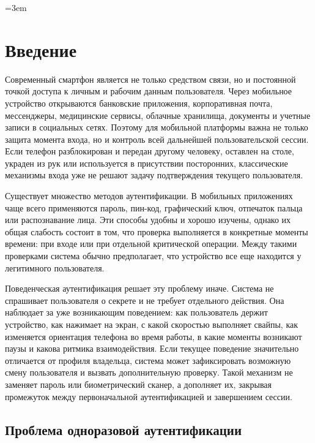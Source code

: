 \documentclass[oneside,senior,etd]{BYUPhys}
\begin{document}
\emergencystretch=3em
\sloppy

\fixmargins
\makepreliminarypages
\oneandhalfspace

\tableofcontents
\clearpage

\section{Введение}

Современный смартфон является не только средством связи, но и постоянной точкой доступа к личным и рабочим данным пользователя. Через мобильное устройство открываются банковские приложения, корпоративная почта, мессенджеры, медицинские сервисы, облачные хранилища, документы и учетные записи в социальных сетях. Поэтому для мобильной платформы важна не только защита момента входа, но и контроль всей дальнейшей пользовательской сессии. Если телефон разблокирован и передан другому человеку, оставлен на столе, украден из рук или используется в присутствии посторонних, классические механизмы входа уже не решают задачу подтверждения текущего пользователя.

Существует множество методов аутентификации. В мобильных приложениях чаще всего применяются пароль, пин-код, графический ключ, отпечаток пальца или распознавание лица. Эти способы удобны и хорошо изучены, однако их общая слабость состоит в том, что проверка выполняется в конкретные моменты времени: при входе или при отдельной критической операции. Между такими проверками система обычно предполагает, что устройство все еще находится у легитимного пользователя.

Поведенческая аутентификация решает эту проблему иначе. Система не спрашивает пользователя о секрете и не требует отдельного действия. Она наблюдает за уже возникающим поведением: как пользователь держит устройство, как нажимает на экран, с какой скоростью выполняет свайпы, как изменяется ориентация телефона во время работы, в какие моменты возникают паузы и какова ритмика взаимодействия. Если текущее поведение значительно отличается от профиля владельца, система может зафиксировать возможную смену пользователя и вызвать дополнительную проверку. Такой механизм не заменяет пароль или биометрический сканер, а дополняет их, закрывая промежуток между первоначальной аутентификацией и завершением сессии.

\subsection{Проблема одноразовой аутентификации}
\end{document}
